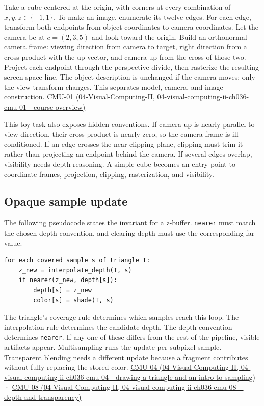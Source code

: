 Take a cube centered at the origin, with corners at every combination of \(x,y,z\in\{-1,1\}\). To make an image, enumerate its twelve edges. For each edge, transform both endpoints from object coordinates to camera coordinates. Let the camera be at \(c=(2,3,5)\) and look toward the origin. Build an orthonormal camera frame: viewing direction from camera to target, right direction from a cross product with the up vector, and camera-up from the cross of those two. Project each endpoint through the perspective divide, then rasterize the resulting screen-space line. The object description is unchanged if the camera moves; only the view transform changes. This separates model, camera, and image construction. \href{../04-Visual-Computing-II/main.pdf\#nameddest=04-visual-computing-ii-ch036-cmu-01---course-overview}{CMU-01 (04-Visual-Computing-II, 04-visual-computing-ii-ch036-cmu-01-\/-\/-course-overview)}

This toy task also exposes hidden conventions. If camera-up is nearly parallel to view direction, their cross product is nearly zero, so the camera frame is ill-conditioned. If an edge crosses the near clipping plane, clipping must trim it rather than projecting an endpoint behind the camera. If several edges overlap, visibility needs depth reasoning. A simple cube becomes an entry point to coordinate frames, projection, clipping, rasterization, and visibility.

\subsection{Opaque sample update}\label{03-visual-computing-i-ch015-opaque-sample-update}

The following pseudocode states the invariant for a z-buffer. \texttt{nearer} must match the chosen depth convention, and clearing depth must use the corresponding far value.

\begin{verbatim}
for each covered sample s of triangle T:
    z_new = interpolate_depth(T, s)
    if nearer(z_new, depth[s]):
        depth[s] = z_new
        color[s] = shade(T, s)
\end{verbatim}

The triangle's coverage rule determines which samples reach this loop. The interpolation rule determines the candidate depth. The depth convention determines \texttt{nearer}. If any one of these differs from the rest of the pipeline, visible artifacts appear. Multisampling runs the update per subpixel sample. Transparent blending needs a different update because a fragment contributes without fully replacing the stored color. \href{../04-Visual-Computing-II/main.pdf\#nameddest=04-visual-computing-ii-ch036-cmu-04---drawing-a-triangle-and-an-intro-to-sampling}{CMU-04 (04-Visual-Computing-II, 04-visual-computing-ii-ch036-cmu-04-\/-\/-drawing-a-triangle-and-an-intro-to-sampling)} · \href{../04-Visual-Computing-II/main.pdf\#nameddest=04-visual-computing-ii-ch036-cmu-08---depth-and-transparency}{CMU-08 (04-Visual-Computing-II, 04-visual-computing-ii-ch036-cmu-08-\/-\/-depth-and-transparency)}

